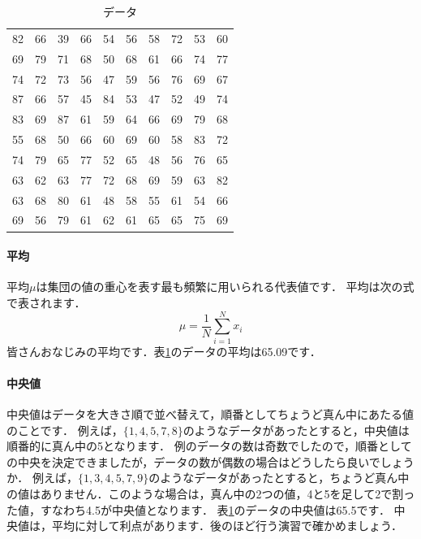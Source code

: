\documentclass[12pt, a4j]{jsreport}
\begin{document}
\begin{table}[tb]
    \caption{データ}
    \centering
    \begin{tabular}{cccccccccc}
       82 & 66 & 39 & 66 & 54 & 56 & 58 & 72 & 53 & 60 \\
       69 & 79 & 71 & 68 & 50 & 68 & 61 & 66 & 74 & 77 \\
       74 & 72 & 73 & 56 & 47 & 59 & 56 & 76 & 69 & 67 \\
       87 & 66 & 57 & 45 & 84 & 53 & 47 & 52 & 49 & 74 \\
       83 & 69 & 87 & 61 & 59 & 64 & 66 & 69 & 79 & 68 \\
       55 & 68 & 50 & 66 & 60 & 69 & 60 & 58 & 83 & 72 \\
       74 & 79 & 65 & 77 & 52 & 65 & 48 & 56 & 76 & 65 \\
       63 & 62 & 63 & 77 & 72 & 68 & 69 & 59 & 63 & 82 \\
       63 & 68 & 80 & 61 & 48 & 58 & 55 & 61 & 54 & 66 \\
       69 & 56 & 79 & 61 & 62 & 61 & 65 & 65 & 75 & 69 \\
    \end{tabular}
    \label{tab:sample}
\end{table}

\paragraph{平均}
平均$\mu$は集団の値の重心を表す最も頻繁に用いられる代表値です．
平均は次の式で表されます．
\begin{equation}
    \mu = \frac{1}{N} \sum_{i=1}^{N} x_i
\end{equation}
皆さんおなじみの平均です．表\ref{tab:sample}のデータの平均は65.09です．


\paragraph{中央値}
中央値はデータを大きさ順で並べ替えて，順番としてちょうど真ん中にあたる値のことです．
例えば，$\{1, 4, 5, 7, 8\}$のようなデータがあったとすると，中央値は順番的に真ん中の5となります．
例のデータの数は奇数でしたので，順番としての中央を決定できましたが，データの数が偶数の場合はどうしたら良いでしょうか．
例えば，$\{1,3,4,5,7,9\}$のようなデータがあったとすると，ちょうど真ん中の値はありません．このような場合は，真ん中の2つの値，4と5を足して2で割った値，すなわち4.5が中央値となります．
表\ref{tab:sample}のデータの中央値は65.5です．
中央値は，平均に対して利点があります．後のほど行う演習で確かめましょう．
\end{document}

